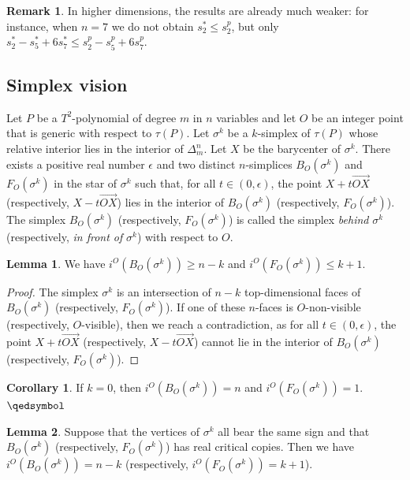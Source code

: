 \documentclass[12pt]{article}
\theoremstyle{definition}
\newtheorem{lem}{Lemma}[section]
\newtheorem{cor}{Corollary}[section]
\newtheorem{rmk}{Remark}[section]
\begin{document}
\begin{rmk}
    In higher dimensions, the results are already much weaker: for instance, when $n=7$ we do not obtain $s_2^* \leq s_2^p$, but only $s_2^* - s_5^* + 6 s_7^* \leq s_2^p - s_5^p + 6 s_7^p$.
\end{rmk}

\subsection{Simplex vision}

\begin{sloppypar}
    Let $P$ be a $T^2$-polynomial of degree $m$ in $n$ variables and let $O$ be an integer point that is generic with respect to $\tau(P)$. Let $\sigma^k$ be a $k$-simplex of $\tau(P)$ whose relative interior lies in the interior of $\Delta_m^n$. Let $X$ be the barycenter of $\sigma^k$. There exists a positive real number $\epsilon$ and two distinct $n$-simplices $B_O(\sigma^k)$ and $F_O(\sigma^k)$ in the star of $\sigma^k$ such that, for all $t \in (0, \epsilon)$, the point $X + t \overrightarrow{OX}$ (respectively, $X - t \overrightarrow{OX}$) lies in the interior of $B_O(\sigma^k)$ (respectively, $F_O(\sigma^k)$). The simplex $B_O(\sigma^k)$ (respectively, $F_O(\sigma^k)$) is called the simplex \textit{behind} $\sigma^k$ (respectively, \textit{in front of} $\sigma^k$) with respect to $O$.
\end{sloppypar}

\begin{lem}
    \label{lemme_indices_devant_derriere}
    We have $i^O(B_O(\sigma^k)) \geq n-k$ and $i^O(F_O(\sigma^k))\leq k+1$.
\end{lem}

\begin{proof}
    The simplex $\sigma^k$ is an intersection of $n-k$  top-dimensional faces of $B_O(\sigma^k)$ (respectively, $F_O(\sigma^k)$). If one of these $n$-faces is $O$-non-visible (respectively, $O$-visible), then we reach a contradiction, as for all $t \in (0, \epsilon)$, the point $X + t \overrightarrow{OX}$ (respectively, $X - t \overrightarrow{OX}$) cannot lie in the interior of $B_O(\sigma^k)$ (respectively, $F_O(\sigma^k)$).
\end{proof}

\begin{cor}
    If $k=0$, then $i^O(B_O(\sigma^k)) = n$ and $i^O(F_O(\sigma^k)) = 1$. \hfill $\qedsymbol$
\end{cor}

\begin{lem}
    \label{lemme_technique_signes}
    Suppose that the vertices of $\sigma^k$ all bear the same sign and that $B_O(\sigma^k)$ (respectively, $F_O(\sigma^k)$) has real critical copies. Then we have $i^O(B_O(\sigma^k)) = n-k$ (respectively, $i^O(F_O(\sigma^k)) = k+1$).
\end{lem}
\end{document}
